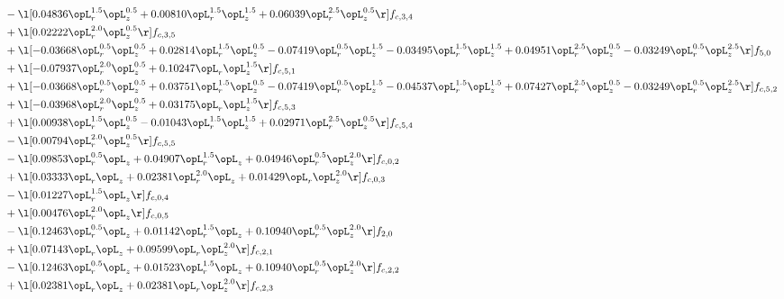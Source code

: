 \begin{alignat}{2}
& - \l[  0.04836 \opL_r^{1.5} \opL_z^{0.5} +  0.00810 \opL_r^{1.5} \opL_z^{1.5} +  0.06039 \opL_r^{2.5} \opL_z^{0.5}  \r] f_{c,3,4} \nonumber \\ 
& + \l[  0.02222 \opL_r^{2.0} \opL_z^{0.5}  \r] f_{c,3,5} \nonumber \\ 
& + \l[  -0.03668 \opL_r^{0.5} \opL_z^{0.5} +  0.02814 \opL_r^{1.5} \opL_z^{0.5}   -0.07419 \opL_r^{0.5} \opL_z^{1.5}   -0.03495 \opL_r^{1.5} \opL_z^{1.5} +  0.04951 \opL_r^{2.5} \opL_z^{0.5}   -0.03249 \opL_r^{0.5} \opL_z^{2.5}  \r] f_{5,0} \nonumber \\ 
& + \l[  -0.07937 \opL_r^{2.0} \opL_z^{0.5} +  0.10247 \opL_r \opL_z^{1.5}  \r] f_{c,5,1} \nonumber \\ 
& + \l[  -0.03668 \opL_r^{0.5} \opL_z^{0.5} +  0.03751 \opL_r^{1.5} \opL_z^{0.5}   -0.07419 \opL_r^{0.5} \opL_z^{1.5}   -0.04537 \opL_r^{1.5} \opL_z^{1.5} +  0.07427 \opL_r^{2.5} \opL_z^{0.5}   -0.03249 \opL_r^{0.5} \opL_z^{2.5}  \r] f_{c,5,2} \nonumber \\ 
& + \l[  -0.03968 \opL_r^{2.0} \opL_z^{0.5} +  0.03175 \opL_r \opL_z^{1.5}  \r] f_{c,5,3} \nonumber \\ 
& + \l[  0.00938 \opL_r^{1.5} \opL_z^{0.5}   -0.01043 \opL_r^{1.5} \opL_z^{1.5} +  0.02971 \opL_r^{2.5} \opL_z^{0.5}  \r] f_{c,5,4} \nonumber \\ 
& - \l[  0.00794 \opL_r^{2.0} \opL_z^{0.5}  \r] f_{c,5,5} \nonumber \\ 
& - \l[  0.09853 \opL_r^{0.5} \opL_z +  0.04907 \opL_r^{1.5} \opL_z +  0.04946 \opL_r^{0.5} \opL_z^{2.0}  \r] f_{c,0,2} \nonumber \\ 
& + \l[  0.03333 \opL_r \opL_z +  0.02381 \opL_r^{2.0} \opL_z +  0.01429 \opL_r \opL_z^{2.0}  \r] f_{c,0,3} \nonumber \\ 
& - \l[  0.01227 \opL_r^{1.5} \opL_z  \r] f_{c,0,4} \nonumber \\ 
& + \l[  0.00476 \opL_r^{2.0} \opL_z  \r] f_{c,0,5} \nonumber \\ 
& - \l[  0.12463 \opL_r^{0.5} \opL_z +  0.01142 \opL_r^{1.5} \opL_z +  0.10940 \opL_r^{0.5} \opL_z^{2.0}  \r] f_{2,0} \nonumber \\ 
& + \l[  0.07143 \opL_r \opL_z +  0.09599 \opL_r \opL_z^{2.0}  \r] f_{c,2,1} \nonumber \\ 
& - \l[  0.12463 \opL_r^{0.5} \opL_z +  0.01523 \opL_r^{1.5} \opL_z +  0.10940 \opL_r^{0.5} \opL_z^{2.0}  \r] f_{c,2,2} \nonumber \\ 
& + \l[  0.02381 \opL_r \opL_z +  0.02381 \opL_r \opL_z^{2.0}  \r] f_{c,2,3} \nonumber \\ 

\end{alignat}
